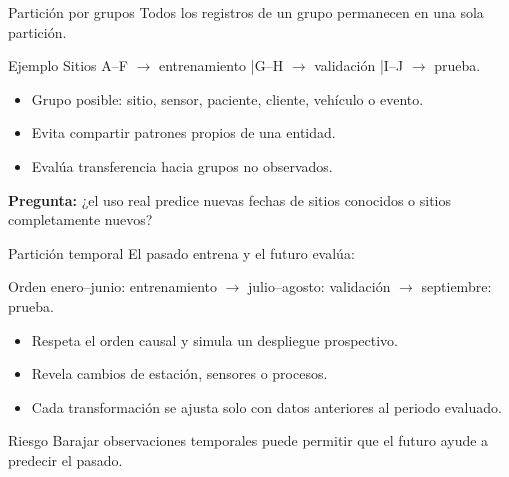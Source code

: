 \documentclass[aspectratio=169,10pt]{beamer}
\begin{document}
\begin{frame}{Partición por grupos}
  \small
  Todos los registros de un grupo permanecen en una sola partición.
  \begin{block}{Ejemplo}
    Sitios A--F $\rightarrow$ entrenamiento \quad|\quad G--H $\rightarrow$ validación \quad|\quad I--J $\rightarrow$ prueba.
  \end{block}
  \begin{itemize}
    \item Grupo posible: sitio, sensor, paciente, cliente, vehículo o evento.
    \item Evita compartir patrones propios de una entidad.
    \item Evalúa transferencia hacia grupos no observados.
  \end{itemize}
  \textbf{Pregunta:} ¿el uso real predice nuevas fechas de sitios conocidos o sitios completamente nuevos?
\end{frame}

\begin{frame}{Partición temporal}
  \small
  El pasado entrena y el futuro evalúa:
  \begin{block}{Orden}
    enero--junio: entrenamiento $\rightarrow$ julio--agosto: validación $\rightarrow$ septiembre: prueba.
  \end{block}
  \begin{itemize}
    \item Respeta el orden causal y simula un despliegue prospectivo.
    \item Revela cambios de estación, sensores o procesos.
    \item Cada transformación se ajusta solo con datos anteriores al periodo evaluado.
  \end{itemize}
  \begin{alertblock}{Riesgo}
    Barajar observaciones temporales puede permitir que el futuro ayude a predecir el pasado.
  \end{alertblock}
\end{frame}
\end{document}
